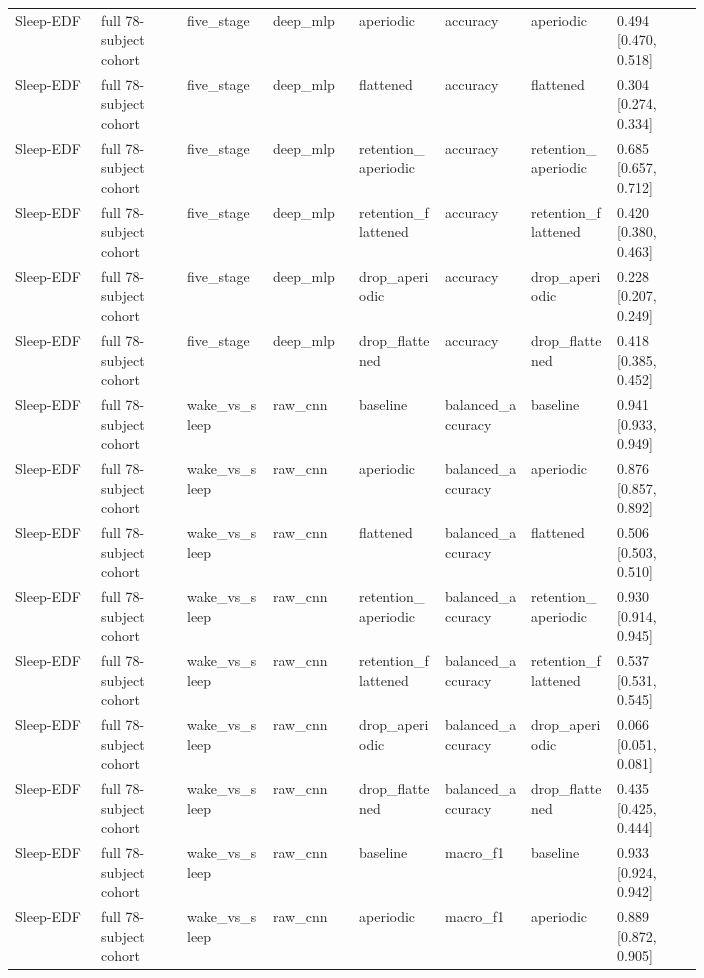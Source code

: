 \begin{longtable}{p{0.10\linewidth}p{0.10\linewidth}p{0.10\linewidth}p{0.10\linewidth}p{0.10\linewidth}p{0.10\linewidth}p{0.10\linewidth}p{0.10\linewidth}}
Sleep-EDF & full 78-subject cohort & five\_stage & deep\_mlp & aperiodic & accuracy & aperiodic & 0.494 [0.470, 0.518]\\
Sleep-EDF & full 78-subject cohort & five\_stage & deep\_mlp & flattened & accuracy & flattened & 0.304 [0.274, 0.334]\\
Sleep-EDF & full 78-subject cohort & five\_stage & deep\_mlp & retention\_aperiodic & accuracy & retention\_aperiodic & 0.685 [0.657, 0.712]\\
Sleep-EDF & full 78-subject cohort & five\_stage & deep\_mlp & retention\_flattened & accuracy & retention\_flattened & 0.420 [0.380, 0.463]\\
Sleep-EDF & full 78-subject cohort & five\_stage & deep\_mlp & drop\_aperiodic & accuracy & drop\_aperiodic & 0.228 [0.207, 0.249]\\
Sleep-EDF & full 78-subject cohort & five\_stage & deep\_mlp & drop\_flattened & accuracy & drop\_flattened & 0.418 [0.385, 0.452]\\
Sleep-EDF & full 78-subject cohort & wake\_vs\_sleep & raw\_cnn & baseline & balanced\_accuracy & baseline & 0.941 [0.933, 0.949]\\
Sleep-EDF & full 78-subject cohort & wake\_vs\_sleep & raw\_cnn & aperiodic & balanced\_accuracy & aperiodic & 0.876 [0.857, 0.892]\\
Sleep-EDF & full 78-subject cohort & wake\_vs\_sleep & raw\_cnn & flattened & balanced\_accuracy & flattened & 0.506 [0.503, 0.510]\\
Sleep-EDF & full 78-subject cohort & wake\_vs\_sleep & raw\_cnn & retention\_aperiodic & balanced\_accuracy & retention\_aperiodic & 0.930 [0.914, 0.945]\\
Sleep-EDF & full 78-subject cohort & wake\_vs\_sleep & raw\_cnn & retention\_flattened & balanced\_accuracy & retention\_flattened & 0.537 [0.531, 0.545]\\
Sleep-EDF & full 78-subject cohort & wake\_vs\_sleep & raw\_cnn & drop\_aperiodic & balanced\_accuracy & drop\_aperiodic & 0.066 [0.051, 0.081]\\
Sleep-EDF & full 78-subject cohort & wake\_vs\_sleep & raw\_cnn & drop\_flattened & balanced\_accuracy & drop\_flattened & 0.435 [0.425, 0.444]\\
Sleep-EDF & full 78-subject cohort & wake\_vs\_sleep & raw\_cnn & baseline & macro\_f1 & baseline & 0.933 [0.924, 0.942]\\
Sleep-EDF & full 78-subject cohort & wake\_vs\_sleep & raw\_cnn & aperiodic & macro\_f1 & aperiodic & 0.889 [0.872, 0.905]\\

\end{longtable}
